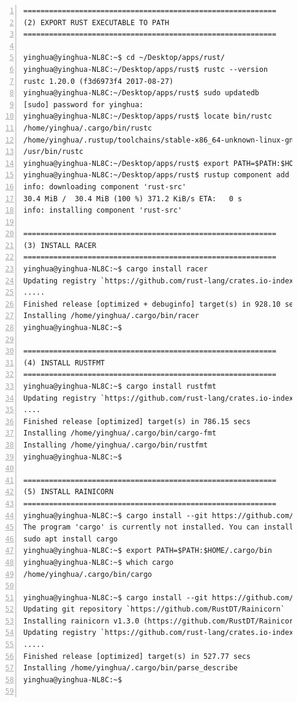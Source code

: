 \begin{lstlisting}[breaklines, frame=single, numbers=left, caption={Linux command for Rust compiler installation}, label=commandline-02]
===========================================================
(2) EXPORT RUST EXECUTABLE TO PATH
===========================================================

yinghua@yinghua-NL8C:~$ cd ~/Desktop/apps/rust/
yinghua@yinghua-NL8C:~/Desktop/apps/rust$ rustc --version
rustc 1.20.0 (f3d6973f4 2017-08-27)
yinghua@yinghua-NL8C:~/Desktop/apps/rust$ sudo updatedb
[sudo] password for yinghua: 
yinghua@yinghua-NL8C:~/Desktop/apps/rust$ locate bin/rustc
/home/yinghua/.cargo/bin/rustc
/home/yinghua/.rustup/toolchains/stable-x86_64-unknown-linux-gnu/bin/rustc
/usr/bin/rustc
yinghua@yinghua-NL8C:~/Desktop/apps/rust$ export PATH=$PATH:$HOME/.cargo/bin
yinghua@yinghua-NL8C:~/Desktop/apps/rust$ rustup component add rust-src
info: downloading component 'rust-src'
30.4 MiB /  30.4 MiB (100 %) 371.2 KiB/s ETA:   0 s               
info: installing component 'rust-src'

===========================================================
(3) INSTALL RACER
===========================================================
yinghua@yinghua-NL8C:~$ cargo install racer
Updating registry `https://github.com/rust-lang/crates.io-index`
.....
Finished release [optimized + debuginfo] target(s) in 928.10 secs
Installing /home/yinghua/.cargo/bin/racer
yinghua@yinghua-NL8C:~$

===========================================================
(4) INSTALL RUSTFMT
===========================================================
yinghua@yinghua-NL8C:~$ cargo install rustfmt
Updating registry `https://github.com/rust-lang/crates.io-index`
....
Finished release [optimized] target(s) in 786.15 secs
Installing /home/yinghua/.cargo/bin/cargo-fmt
Installing /home/yinghua/.cargo/bin/rustfmt
yinghua@yinghua-NL8C:~$

===========================================================
(5) INSTALL RAINICORN
===========================================================
yinghua@yinghua-NL8C:~$ cargo install --git https://github.com/RustDT/Rainicorn --tag version_1.x
The program 'cargo' is currently not installed. You can install it by typing:
sudo apt install cargo
yinghua@yinghua-NL8C:~$ export PATH=$PATH:$HOME/.cargo/bin
yinghua@yinghua-NL8C:~$ which cargo
/home/yinghua/.cargo/bin/cargo

yinghua@yinghua-NL8C:~$ cargo install --git https://github.com/RustDT/Rainicorn --tag version_1.x
Updating git repository `https://github.com/RustDT/Rainicorn`
Installing rainicorn v1.3.0 (https://github.com/RustDT/Rainicorn?tag=version_1.x#365f819b)
Updating registry `https://github.com/rust-lang/crates.io-index`
.....
Finished release [optimized] target(s) in 527.77 secs
Installing /home/yinghua/.cargo/bin/parse_describe
yinghua@yinghua-NL8C:~$


\end{lstlisting}
